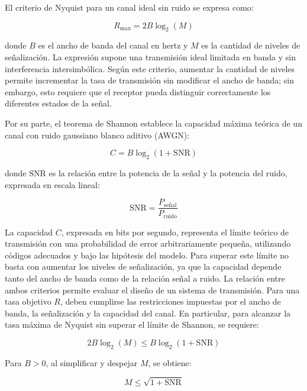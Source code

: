 \documentclass[11pt,a4paper]{article}
\begin{document}
El criterio de Nyquist para un canal ideal sin ruido se expresa como:

\begin{equation}
    R_{\max} = 2B\log_2(M)
\end{equation}

donde $B$ es el ancho de banda del canal en hertz y $M$ es la cantidad de niveles de señalización. La expresión supone una transmisión ideal limitada en banda y sin interferencia intersimbólica. Según este criterio, aumentar la cantidad de niveles permite incrementar la tasa de transmisión sin modificar el ancho de banda; sin embargo, esto requiere que el receptor pueda distinguir correctamente los diferentes estados de la señal.

Por su parte, el teorema de Shannon establece la capacidad máxima teórica de un canal con ruido gaussiano blanco aditivo (AWGN):

\begin{equation}
    C = B\log_2(1+\mathrm{SNR})
\end{equation}

donde $\mathrm{SNR}$ es la relación entre la potencia de la señal y la potencia del ruido, expresada en escala lineal:

\begin{equation}
    \mathrm{SNR} = \frac{P_{\text{señal}}}{P_{\text{ruido}}}
\end{equation}

La capacidad $C$, expresada en bits por segundo, representa el límite teórico de transmisión con una probabilidad de error arbitrariamente pequeña, utilizando códigos adecuados y bajo las hipótesis del modelo. Para superar este límite no basta con aumentar los niveles de señalización, ya que la capacidad depende tanto del ancho de banda como de la relación señal a ruido.
La relación entre ambos criterios permite evaluar el diseño de un sistema de transmisión. Para una tasa objetivo $R$, deben cumplirse las restricciones impuestas por el ancho de banda, la señalización y la capacidad del canal. En particular, para alcanzar la tasa máxima de Nyquist sin superar el límite de Shannon, se requiere:

\begin{equation}
    2B\log_2(M) \leq B\log_2(1+\mathrm{SNR})
\end{equation}

Para $B>0$, al simplificar y despejar $M$, se obtiene:

\begin{equation}
    M \leq \sqrt{1+\mathrm{SNR}}
\end{equation}
\end{document}
